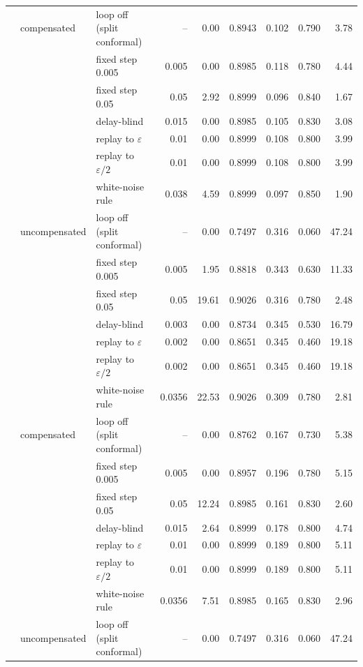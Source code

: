 \begin{tabular}{@{}rllrrrrrr@{}}
 & compensated & loop off (split conformal) & -- & 0.00 & 0.8943 & 0.102 & 0.790 & 3.78 \\
 &  & fixed step 0.005 & 0.005 & 0.00 & 0.8985 & 0.118 & 0.780 & 4.44 \\
 &  & fixed step 0.05 & 0.05 & 2.92 & 0.8999 & 0.096 & 0.840 & 1.67 \\
 &  & delay-blind & 0.015 & 0.00 & 0.8985 & 0.105 & 0.830 & 3.08 \\
 &  & replay to $\varepsilon$ & 0.01 & 0.00 & 0.8999 & 0.108 & 0.800 & 3.99 \\
 &  & replay to $\varepsilon/2$ & 0.01 & 0.00 & 0.8999 & 0.108 & 0.800 & 3.99 \\
 &  & white-noise rule & 0.038 & 4.59 & 0.8999 & 0.097 & 0.850 & 1.90 \\
\addlinespace
3 & uncompensated & loop off (split conformal) & -- & 0.00 & 0.7497 & 0.316 & 0.060 & 47.24 \\
 &  & fixed step 0.005 & 0.005 & 1.95 & 0.8818 & 0.343 & 0.630 & 11.33 \\
 &  & fixed step 0.05 & 0.05 & 19.61 & 0.9026 & 0.316 & 0.780 & 2.48 \\
 &  & delay-blind & 0.003 & 0.00 & 0.8734 & 0.345 & 0.530 & 16.79 \\
 &  & replay to $\varepsilon$ & 0.002 & 0.00 & 0.8651 & 0.345 & 0.460 & 19.18 \\
 &  & replay to $\varepsilon/2$ & 0.002 & 0.00 & 0.8651 & 0.345 & 0.460 & 19.18 \\
 &  & white-noise rule & 0.0356 & 22.53 & 0.9026 & 0.309 & 0.780 & 2.81 \\
 & compensated & loop off (split conformal) & -- & 0.00 & 0.8762 & 0.167 & 0.730 & 5.38 \\
 &  & fixed step 0.005 & 0.005 & 0.00 & 0.8957 & 0.196 & 0.780 & 5.15 \\
 &  & fixed step 0.05 & 0.05 & 12.24 & 0.8985 & 0.161 & 0.830 & 2.60 \\
 &  & delay-blind & 0.015 & 2.64 & 0.8999 & 0.178 & 0.800 & 4.74 \\
 &  & replay to $\varepsilon$ & 0.01 & 0.00 & 0.8999 & 0.189 & 0.800 & 5.11 \\
 &  & replay to $\varepsilon/2$ & 0.01 & 0.00 & 0.8999 & 0.189 & 0.800 & 5.11 \\
 &  & white-noise rule & 0.0356 & 7.51 & 0.8985 & 0.165 & 0.830 & 2.96 \\
\addlinespace
7 & uncompensated & loop off (split conformal) & -- & 0.00 & 0.7497 & 0.316 & 0.060 & 47.24 \\

\end{tabular}
